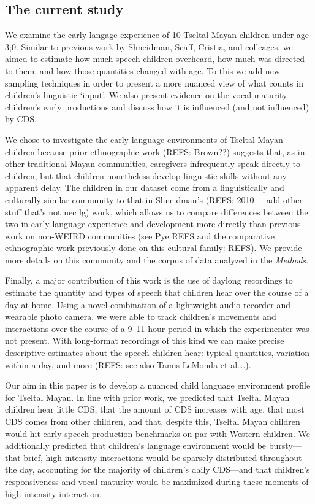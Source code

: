 \documentclass[man]{apa6}
\theoremstyle{definition}
\theoremstyle{definition}
\theoremstyle{definition}
\theoremstyle{remark}
\begin{document}
\subsection{The current study}\label{the-current-study}

We examine the early langage experience of 10 Tseltal Mayan children
under age 3;0. Similar to previous work by Shneidman, Scaff, Cristia,
and colleages, we aimed to estimate how much speech children overheard,
how much was directed to them, and how those quantities changed with
age. To this we add new sampling techniques in order to present a more
nuanced view of what counts in children's linguistic `input'. We also
present evidence on the vocal maturity children's early productions and
discuss how it is influenced (and not influenced) by CDS.

We chose to investigate the early language environments of Tseltal Mayan
children because prior ethnographic work (REFS: Brown??) suggests that,
as in other traditional Mayan communities, caregivers infrequently speak
directly to children, but that children nonetheless develop linguistic
skills without any apparent delay. The children in our dataset come from
a linguistically and culturally similar community to that in Shneidman's
(REFS: 2010 + add other stuff that's not nec lg) work, which allows us
to compare differences between the two in early language experience and
development more directly than previous work on non-WEIRD communities
(see Pye REFS and the comparative ethnographic work previously done on
this cultural family: REFS). We provide more details on this community
and the corpus of data analyzed in the \emph{Methods}.

Finally, a major contribution of this work is the use of daylong
recordings to estimate the quantity and types of speech that children
hear over the course of a day at home. Using a novel combination of a
lightweight audio recorder and wearable photo camera, we were able to
track children's movements and interactions over the course of a
9--11-hour period in which the experimenter was not present. With
long-format recordings of this kind we can make precise descriptive
estimates about the speech children hear: typical quantities, variation
within a day, and more (REFS: see also Tamis-LeMonda et al\ldots{}.).

Our aim in this paper is to develop a nuanced child language environment
profile for Tseltal Mayan. In line with prior work, we predicted that
Tseltal Mayan children hear little CDS, that the amount of CDS increases
with age, that most CDS comes from other children, and that, despite
this, Tseltal Mayan children would hit early speech production
benchmarks on par with Western children. We additionally predicted that
children's language environment would be bursty---that brief,
high-intensity interactions would be sparsely distributed throughout the
day, accounting for the majority of children's daily CDS---and that
children's responsiveness and vocal maturity would be maximized during
these moments of high-intensity interaction.
\end{document}
